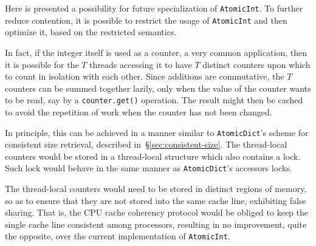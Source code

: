 Here is presented a possibility for future specialization of \texttt{AtomicInt}.
To further reduce contention, it is possible to restrict the usage of \texttt{AtomicInt} and then optimize it, based on the restricted semantics.

In fact, if the integer itself is used as a counter, a very common application, then it is possible for the $T$ threads accessing it to have $T$ distinct counters upon which to count in isolation with each other.
Since additions are commutative, the $T$ counters can be summed together lazily, only when the value of the counter wants to be read, say by a \texttt{{counter.get()}} operation.
The result might then be cached to avoid the repetition of work when the counter has not been changed.

In principle, this can be achieved in a manner similar to \texttt{AtomicDict}'s scheme for consistent size retrieval, described in~\S\ref{sec:consistent-size}.
The thread-local counters would be stored in a thread-local structure which also contains a lock.
Such lock would behave in the same manner as \texttt{AtomicDict}'s accessors locks.

The thread-local counters would need to be stored in distinct regions of memory, so as to ensure that they are not stored into the same cache line, exhibiting false sharing.
That is, the CPU cache coherency protocol would be obliged to keep the single cache line consistent among processors, resulting in no improvement, quite the opposite, over the current implementation of \texttt{AtomicInt}.
